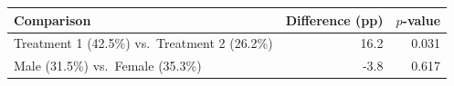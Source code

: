 \begin{tabular}{lrr}
  \toprule
  Comparison & Difference (pp) & $p$-value \\ 
  \midrule
  Treatment 1 (42.5\%) vs.\ Treatment 2 (26.2\%) & 16.2 & 0.031 \\ 
  Male (31.5\%) vs.\ Female (35.3\%) & -3.8 & 0.617 \\ 
  \bottomrule
\end{tabular}
